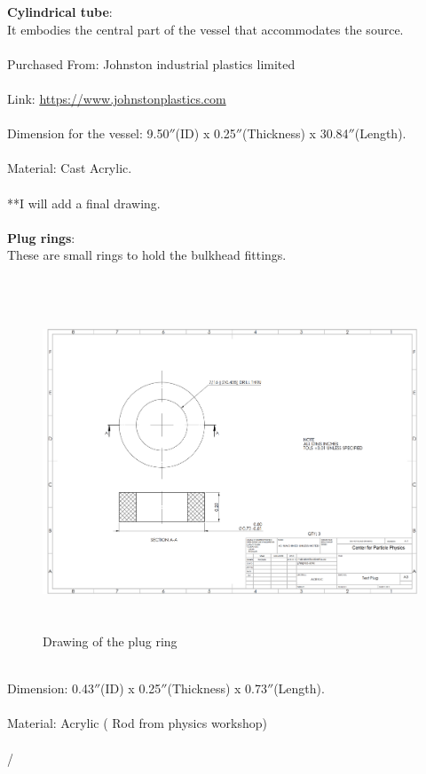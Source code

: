 \textbf{Cylindrical tube}: \\
It embodies the central part of the vessel that accommodates the source.\\
\\
Purchased From: Johnston industrial plastics limited\\
\\
Link:  \url{https://www.johnstonplastics.com}\\
\\
Dimension for the vessel: 9.50$''$(ID) x 0.25$''$(Thickness) x 30.84$''$(Length).\\
\\
Material: Cast Acrylic.\\
\\
**I will add a final drawing.\\
\\
\textbf{Plug rings}:\\
These are small rings to hold the bulkhead fittings.\\
\\
\begin{figure}[!htpb]
  \centering
  \includegraphics[width = 12cm, height=10cm ]{figures/plug}
  \caption{Drawing of the plug ring}
  \label{fig:plug}
\end{figure}
\\
Dimension: 0.43$''$(ID) x 0.25$''$(Thickness) x 0.73$''$(Length).\\
\\
Material: Acrylic ( Rod from physics workshop)\\
\\
/%
